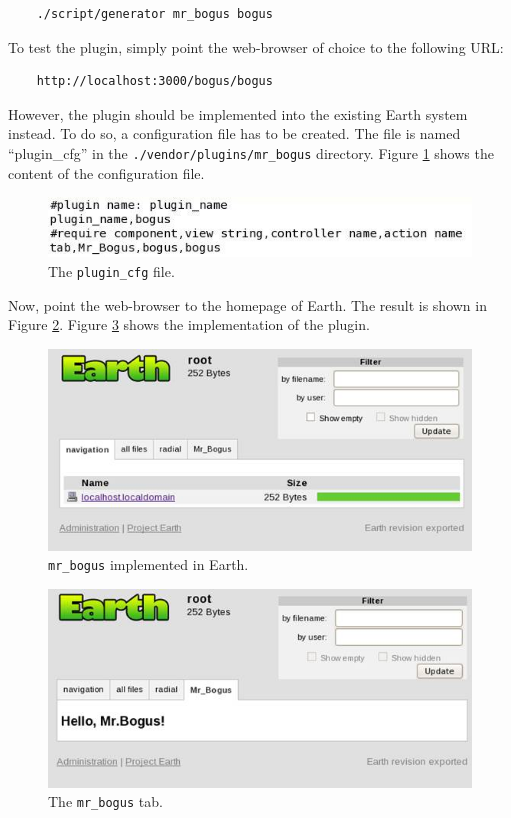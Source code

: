 \documentclass{article}
\begin{document}
\begin{verbatim}
    ./script/generator mr_bogus bogus
\end{verbatim}

To test the plugin, simply point the web-browser of choice to the following URL:

\begin{verbatim}
    http://localhost:3000/bogus/bogus
\end{verbatim}

However, the plugin should be implemented into the existing Earth system instead. To do so, a configuration file has to be created. The file is named ``plugin\_cfg'' in the \texttt{./vendor/plugins/mr\_bogus} directory. Figure \ref{fig:asd} shows the content of the configuration file.

\begin{figure}
    \centering
    \includegraphics[scale=0.7]{fig/asd.jpg}
    \caption{The \texttt{plugin\_cfg} file.}
    \label{fig:asd}
\end{figure}

Now, point the web-browser to the homepage of Earth. The result is shown in Figure \ref{fig:instruction-6}. Figure \ref{fig:instruction-7} shows the implementation of the plugin.

\begin{figure}
    \centering
    \includegraphics[scale=0.7]{fig/instruction-6.jpg}
    \caption{\texttt{mr\_bogus} implemented in Earth.}
    \label{fig:instruction-6}
\end{figure}

\begin{figure}
    \centering
    \includegraphics[scale=0.7]{fig/instruction-7.jpg}
    \caption{The \texttt{mr\_bogus} tab.}
    \label{fig:instruction-7}
\end{figure}
\end{document}
